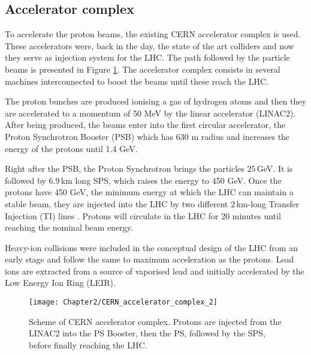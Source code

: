 
\subsection{Accelerator complex}
\label{sec:Chap2:LHC:AcceleratorComplex}
To accelerate the proton beams, the existing CERN accelerator complex is used.
These accelerators were, back in the day, the state of the art colliders and now they serve
as injection system for the LHC. The path followed by the particle beams is presented in
 Figure \ref{fig:Chap2:LHC_AcceleratorComplex}. The accelerator complex consists in
several machines interconnected to boost the beams until these reach the LHC.

The proton bunches are produced ionising a gas of hydrogen atoms and then they are accelerated to a
momentum of 50 MeV by the linear accelerator (LINAC2). %
After being produced, the beams enter into the first circular accelerator, the Proton Synchrotron 
Booster (PSB) which has 630 m radius and increases the energy of the protons until 1.4 GeV.

Right after the PSB, the Proton Synchrotron brings the particles $25\,$GeV. 
It is followed by $6.9\,$km long SPS, which raises the energy to 450 GeV. 
Once the protons have 450 GeV, the minimum energy at which the LHC can maintain a stable beam, they
are injected into the LHC by two different $2\,$km-long Transfer Injection (TI) lines \cite{Lari:1069714}. 
Protons will circulate in the LHC for 20 minutes until reaching the nominal beam energy\cite{Evans_2008}.
 
Heavy-ion collisions were included in the conceptual design of the LHC from an early stage and 
follow the same to maximum acceleration as the protons. Lead ions are extracted from a source 
of vaporised lead and initially accelerated by the Low Energy Ion Ring (LEIR). 

	
	\begin{figure}
 	  \centering
 	  \texttt{[image: Chapter2/CERN\_accelerator\_complex\_2]}
	  \caption{Scheme of CERN accelerator complex. Protons are injected from the LINAC2 into the PS Booster, then the PS, 
	  followed by the SPS, before finally reaching the LHC.}
	  \label{fig:Chap2:LHC_AcceleratorComplex}
	\end{figure}

